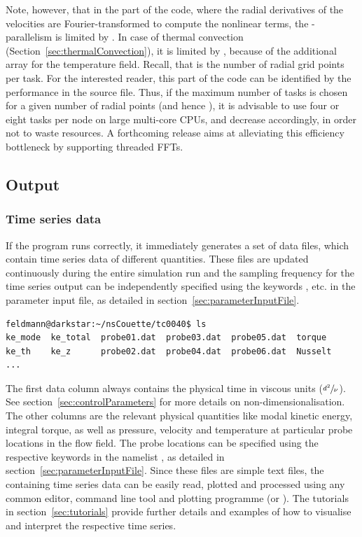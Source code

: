 \documentclass[a4paper, 11pt, DIV=11]{scrartcl}
\begin{document}
Note, however, that in the part of the code, where the radial derivatives of the velocities are
Fourier-transformed to compute the nonlinear terms, the \omp-parallelism is limited by
. In case of thermal convection (Section~\ref{sec:thermalConvection}), it is
limited by , because of the additional array for the temperature field. Recall, 
that  is the number of radial grid points per \mpi task. For the interested reader, 
this part of the code can be identified by the performance  in the  
 source file. Thus, if the maximum number of \mpi tasks is chosen for a
given number of radial points (and hence ), it is advisable to use four or eight 
\mpi tasks per node on large multi-core CPUs, and decrease   
accordingly, in order not to waste resources. A forthcoming release aims at alleviating this
efficiency bottleneck by supporting threaded FFTs.
\color{black}

\subsection{Output}
\label{sec:output}

\subsubsection{Time series data}
\label{sec:timeSeries}

If the program runs correctly, it immediately generates a set of data
files, which contain time series data of different quantities. These
files are updated continuously during the entire simulation run and
the sampling frequency for the time series output can be independently
specified using the keywords ,  etc. in the
parameter input file, as detailed in section~\ref{sec:parameterInputFile}.
\begin{lstlisting}[language=bash]
feldmann@darkstar:~/nsCouette/tc0040$ ls
ke_mode  ke_total  probe01.dat  probe03.dat  probe05.dat  torque
ke_th    ke_z      probe02.dat  probe04.dat  probe06.dat  Nusselt
...
\end{lstlisting}
The first data column always contains the physical time in viscous units
($\sfrac{d^2}{\nu}$). See section~\ref{sec:controlParameters} for more
details on non-dimensionalisation. The other columns are the relevant
physical quantities like modal kinetic energy, integral torque, as well
as pressure, velocity and temperature at particular probe locations in the
flow field. The probe locations can be specified using the respective
keywords in the namelist , as detailed in
section~\ref{sec:parameterInputFile}. Since these files are simple
text files, the containing time series data can be easily read, plotted and
processed using any common editor, command line tool and plotting
programme (\eg \gnuplot or ). The tutorials in
section~\ref{sec:tutorials} provide further details and examples of how
to visualise and interpret the respective time series.
\end{document}
